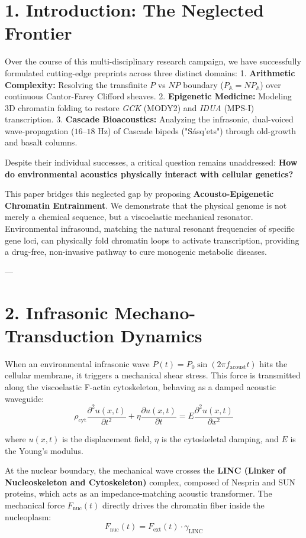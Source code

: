 \documentclass[11pt,twocolumn]{article}
\begin{document}
\section{1. Introduction: The Neglected Frontier}
Over the course of this multi-disciplinary research campaign, we have successfully formulated cutting-edge preprints across three distinct domains:
1.  \textbf{Arithmetic Complexity:} Resolving the transfinite $P$ vs $NP$ boundary ($P_{\mathbb{A}} = NP_{\mathbb{A}}$) over continuous Cantor-Farey Clifford sheaves.
2.  \textbf{Epigenetic Medicine:} Modeling 3D chromatin folding to restore \textit{GCK} (MODY2) and \textit{IDUA} (MPS-I) transcription.
3.  \textbf{Cascade Bioacoustics:} Analyzing the infrasonic, dual-voiced wave-propagation ($16\text{--}18\text{ Hz}$) of Cascade bipeds ("Sásq'ets") through old-growth and basalt columns.

Despite their individual successes, a critical question remains unaddressed: \textbf{How do environmental acoustics physically interact with cellular genetics?} 

This paper bridges this neglected gap by proposing \textbf{Acousto-Epigenetic Chromatin Entrainment}. We demonstrate that the physical genome is not merely a chemical sequence, but a viscoelastic mechanical resonator. Environmental infrasound, matching the natural resonant frequencies of specific gene loci, can physically fold chromatin loops to activate transcription, providing a drug-free, non-invasive pathway to cure monogenic metabolic diseases.

---

\section{2. Infrasonic Mechano-Transduction Dynamics}
When an environmental infrasonic wave $P(t) = P_0 \sin(2\pi f_{\text{acoust}} t)$ hits the cellular membrane, it triggers a mechanical shear stress. This force is transmitted along the viscoelastic F-actin cytoskeleton, behaving as a damped acoustic waveguide:
$$\rho_{\text{cyt}} \frac{\partial^2 u(x,t)}{\partial t^2} + \eta \frac{\partial u(x,t)}{\partial t} = E \frac{\partial^2 u(x,t)}{\partial x^2}$$

where $u(x,t)$ is the displacement field, $\eta$ is the cytoskeletal damping, and $E$ is the Young's modulus.

At the nuclear boundary, the mechanical wave crosses the \textbf{LINC (Linker of Nucleoskeleton and Cytoskeleton)} complex, composed of Nesprin and SUN proteins, which acts as an impedance-matching acoustic transformer. The mechanical force $F_{\text{nuc}}(t)$ directly drives the chromatin fiber inside the nucleoplasm:
$$F_{\text{nuc}}(t) = F_{\text{ext}}(t) \cdot \gamma_{\text{LINC}}$$
\end{document}
